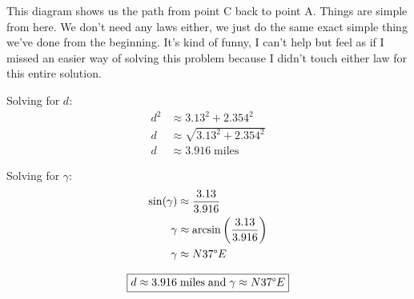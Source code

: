 \begin{solution}
    This diagram shows us the path from point C back to point A. Things are simple from here. We don't need any laws either, we just do the same exact simple thing we've done from the beginning. It's kind of funny, I can't help but feel as if I missed an easier way of solving this problem because I didn't touch either law for this entire solution. \medskip
    
    Solving for $d$:
    \begin{align}
        d^2 &\approx 3.13^2 + 2.354^2 \\
        d &\approx \sqrt{3.13^2 + 2.354^2} \\
        d &\approx 3.916 \; \text{miles}
    \end{align}
    
    Solving for $\gamma$:
    \begin{align}
        \sin(\gamma) &\approx \frac{3.13}{3.916} \\
        \gamma &\approx \arcsin \left( \frac{3.13}{3.916} \right) \\ 
        \gamma &\approx N 37\degree E
    \end{align}
    
    \[\boxed{ d \approx 3.916 \; \text{miles} \; \text{and} \; \gamma \approx N 37\degree E  }\]
\end{solution}